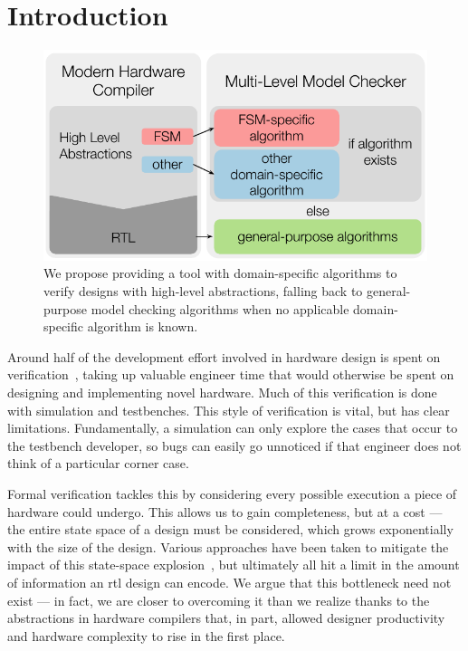 \documentclass[acmsmall,screen,review]{acmart}
\begin{document}
\section{Introduction}
\begin{figure}
  \includegraphics[width=\columnwidth]{core-idea.pdf}
  \caption{We propose providing a tool with domain-specific algorithms to verify designs with high-level abstractions, falling back to general-purpose model checking algorithms when no applicable domain-specific algorithm is known.} \label{fig:intro-verif}
\end{figure}

Around half of the development effort involved in hardware design is spent on verification~\cite{wilson2018verifstudy, wilson2020verifstudy, wilson2022verifstudy}, taking up valuable engineer time that would otherwise be spent on designing and implementing novel hardware.
Much of this verification is done with simulation and testbenches.
This style of verification is vital, but has clear limitations.
Fundamentally, a simulation can only explore the cases that occur to the testbench developer, so bugs can easily go unnoticed if that engineer does not think of a particular corner case.

Formal verification tackles this by considering every possible execution a piece of hardware could undergo.
This allows us to gain completeness, but at a cost --- the entire state space of a design must be considered, which grows exponentially with the size of the design.
Various approaches have been taken to mitigate the impact of this state-space explosion~\cite{Clarke2001, clarke2012explosion, nejati2021explosion}, but ultimately all hit a limit in the amount of information an \ac{rtl} design can encode.
We argue that this bottleneck need not exist --- in fact, we are closer to overcoming it than we realize thanks to the abstractions in hardware compilers that, in part, allowed designer productivity and hardware complexity to rise in the first place.
\end{document}
